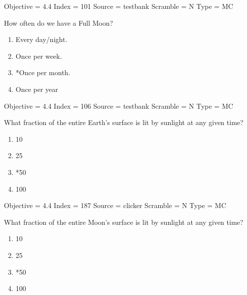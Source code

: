 \documentclass[11pt]{article}
\begin{document}
\begin{enumerate}
\begin{minipage}{\textwidth}
\begin{minipage}{\textwidth}
Objective = 4.4
Index = 101
Source = testbank
Scramble = N
Type = MC
\end{minipage}
\end{minipage}
\vskip 0.20in

\begin{minipage}{\textwidth}
\begin{minipage}{\textwidth}
\item How often do we have a Full Moon?
\begin{multicols}{3}
\begin{enumerate} 
\setlength{\itemsep}{1pt} 
\setlength{\parskip}{0pt} 
\setlength{\parsep}{0pt}
\setlength{\multicolsep}{1pt} 
\item Every day/night.
\item Once per week.
\item *Once per month.
\item Once per year
\end{enumerate} 
\vfill 
\end{multicols}

Objective = 4.4
Index = 106
Source = testbank
Scramble = N
Type = MC
\end{minipage}
\end{minipage}
\vskip 0.20in

\begin{minipage}{\textwidth}
\begin{minipage}{\textwidth}
\item What fraction of the entire Earth’s surface is lit by sunlight at any given time?
\begin{multicols}{3}
\begin{enumerate} 
\setlength{\itemsep}{1pt} 
\setlength{\parskip}{0pt} 
\setlength{\parsep}{0pt}
\setlength{\multicolsep}{1pt} 
\item 10%
\item 25%
\item *50%
\item 100%
\end{enumerate} 
\vfill 
\end{multicols}

Objective = 4.4
Index = 187
Source = clicker
Scramble = N
Type = MC
\end{minipage}
\end{minipage}
\vskip 0.20in

\begin{minipage}{\textwidth}
\begin{minipage}{\textwidth}
\item What fraction of the entire Moon’s surface is lit by sunlight at any given time?
\begin{multicols}{3}
\begin{enumerate} 
\setlength{\itemsep}{1pt} 
\setlength{\parskip}{0pt} 
\setlength{\parsep}{0pt}
\setlength{\multicolsep}{1pt} 
\item 10%
\item 25%
\item *50%
\item 100%
\end{enumerate} 
\vfill 
\end{multicols}


\end{minipage}
\end{minipage}
\end{enumerate}
\end{document}
